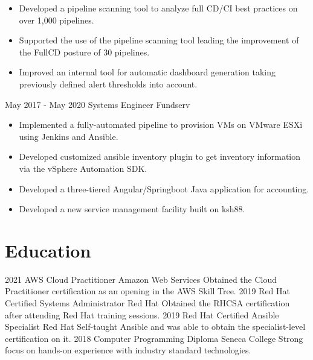 \documentclass[]{friggeri-cv}
\begin{document}
\begin{entrylist}
{\begin{itemize}
        \item Developed a pipeline scanning tool to analyze full CD/CI best practices on over 1,000 pipelines.
        \item Supported the use of the pipeline scanning tool leading the improvement of the FullCD posture of 30 pipelines.
        \item Improved an internal tool for automatic dashboard generation taking previously defined alert thresholds into account.
    \end{itemize}}
  \entry
    {May 2017 - May 2020}
    {Systems Engineer}
    {Fundserv}
    {\begin{itemize}
        \item Implemented a fully-automated pipeline to provision VMs on VMware ESXi\\using Jenkins and Ansible.
        \item Developed customized ansible inventory plugin to get inventory information via the vSphere Automation SDK.
        \item Developed a three-tiered Angular/Springboot Java application for accounting.
        \item Developed a new service management facility built on ksh88.
    \end{itemize}}
\end{entrylist}

\section{Education}
\begin{entrylist}
  \entry
    {2021}
    {AWS Cloud Practitioner}
    {Amazon Web Services}
    {Obtained the Cloud Practitioner certification as an opening in the AWS Skill Tree.}
  \entry
    {2019}
    {Red Hat Certified Systems Administrator}
    {Red Hat}
    {Obtained the RHCSA certification after attending Red Hat training sessions.}
  \entry
    {2019}
    {Red Hat Certified Ansible Specialist}
    {Red Hat}
    {Self-taught Ansible and was able to obtain the specialist-level certification on it.}
  \entry
    {2018}
    {Computer Programming Diploma}
    {Seneca College}
    {Strong focus on hands-on experience with industry standard technologies.}
\end{entrylist}
\end{document}
